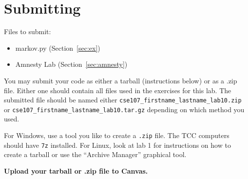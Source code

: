 \documentclass[11pt]{cselabheader}
\begin{document}
\pagebreak
\section{Submitting}

Files to submit:
\begin{itemize}
\item markov.py (Section~\ref{sec:ex})
\item Amnesty Lab (Section~\ref{sec:amnesty})
\end{itemize}

You may submit your code as either a tarball (instructions below) or as a .zip
file. Either one should contain all files used in the exercises for this lab.
The submitted file should be named either
\texttt{cse107\_firstname\_lastname\_lab10.zip} or
\texttt{cse107\_firstname\_lastname\_lab10.tar.gz} depending on which method you
used.

For Windows, use a tool you like to create a \texttt{.zip} file. The TCC
computers should have \texttt{7z} installed. For Linux, look at lab 1 for
instructions on how to create a tarball or use the ``Archive Manager'' graphical
tool.

\begin{center}
  \textbf{Upload your tarball or .zip file to Canvas.}
\end{center}
\end{document}
